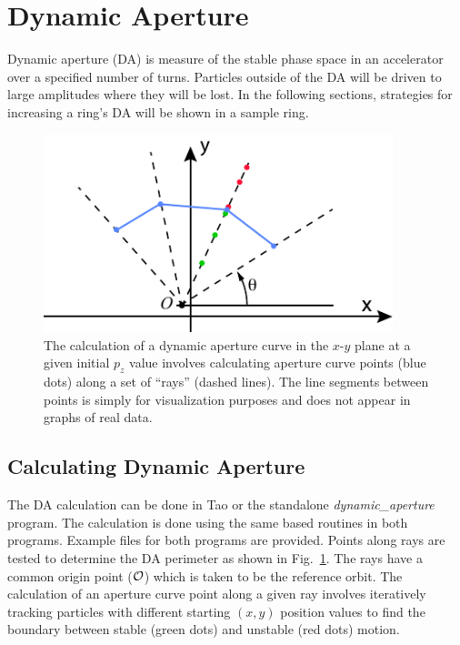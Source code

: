 \documentclass{hitec}     %
\begin{document}
{{{{\newpage

\section{Dynamic Aperture}
Dynamic aperture (DA) is measure of the stable phase space in an accelerator over a specified number of turns. Particles outside of the DA will be driven to large amplitudes where they will be lost. In the following sections, strategies for increasing a ring's DA will be shown in a sample ring.

\begin{figure}[h!]
  \centering
  \includegraphics[width=4in]{figures/aperture-rays.pdf}
  \caption{
The calculation of a dynamic aperture curve in the $x$-$y$ plane at a given initial $p_z$ value
involves calculating aperture curve points (blue dots) along a set of ``rays'' (dashed lines). 
The line segments between
points is simply for visualization purposes and does not appear in graphs of real data. 
  }
  \label{f:da-ray}
\end{figure}

\subsection{Calculating Dynamic Aperture}

The DA calculation can be done in Tao or the standalone \textit{dynamic_aperture} program. The calculation is done using the same \bmad based routines in both programs. Example files for both programs are provided. 
Points along rays are tested to determine the DA perimeter as shown in Fig.~\ref{f:da-ray}.
The rays have a common origin point ($\cal O$) which is taken to be the reference orbit. 
The calculation of an aperture curve point along a
given ray involves iteratively tracking particles with different starting $(x, y)$ position values
to find the boundary between stable (green dots) and unstable (red dots) motion.

}}}}
\end{document}
